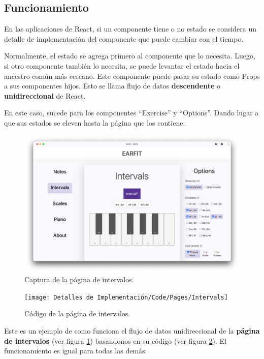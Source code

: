 \documentclass[12pt,twoside,titlepage]{report}
\begin{document}
\subsection{Funcionamiento}

En las aplicaciones de React, si un componente tiene o no estado se considera un detalle de implementación del componente que puede cambiar con el tiempo.

Normalmente, el estado se agrega primero al componente que lo necesita. Luego, si otro componente también lo necesita, se puede levantar el estado hacia el ancestro común más cercano. Este componente puede pasar su estado como Props a sus componentes hijos. Esto se llama flujo de datos \textbf{descendente} o \textbf{unidireccional} de React. 

En este caso, sucede para los componentes ``Exercise'' y ``Options''. Dando lugar a que sus estados se eleven hasta la página que los contiene.

\begin{figure}[H]
    \centering
    \includegraphics[width=\textwidth]{Capturas Earfit/PC/Intervals}
    \caption{Captura de la página de intervalos.}
    \label{fig:PCIntervals1}
\end{figure}

\begin{figure}[H]
    \centering
    \texttt{[image: Detalles de Implementación/Code/Pages/Intervals]}
    \caption{Código de la página de intervalos.}
    \label{fig:IntervalsPage}
\end{figure}

Este es un ejemplo de como funciona el flujo de datos unidireccional de la \textbf{página de intervalos} (ver figura \ref{fig:PCIntervals1}) basandonos en su código (ver figura \ref{fig:IntervalsPage}). El funcionamiento es igual para todas las demás: 
\end{document}
